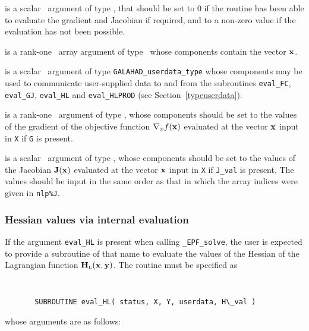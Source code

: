 \documentclass{galahad}
\newcommand{\packagename}{EPF}
\newcommand{\fullpackagename}{\libraryname\_\packagename}
\newcommand{\solver}{{\tt \fullpackagename\_solve}}
\newcommand{\bmHL}{\bmH\sub{L}}
\begin{document}
\begin{description}
 is a scalar \intentout\ argument of type \integer,
that should be set to 0 if the routine has been able to evaluate
the gradient and Jacobian if required,
and to a non-zero value if the evaluation has not been possible.

 is a rank-one \intentin\ array argument of type \realdp\
whose components contain the vector ${\mathbf{x}}$.

 is a scalar \intentinout\ argument of type
{\tt GALAHAD\_userdata\_type} whose components may be used
to communicate user-supplied data to and from the
subroutines {\tt eval\_FC}, {\tt eval\_GJ},
{\tt eval\_HL} and {\tt eval\_HLPROD}
(see Section~\ref{typeuserdata}).

 is a rank-one \intentout\ argument of type \realdp,
whose components should be set to the values of the gradient
of the objective function $\nabla_x f({\mathbf{x}})$
evaluated at the vector ${\mathbf{x}}$ input in {\tt X} if {\tt G} is present.

 is a scalar \intentout\ argument of type \realdp,
whose components should be set to the values of the Jacobian ${\mathbf{J}}({\mathbf{x}})$
evaluated at the vector ${\mathbf{x}}$ input in {\tt X} if {\tt J\_val} is present.
The values should be input in the same order as that in which the array 
indices were given in {\tt nlp\%J}.

\end{description}


\subsubsection{Hessian values via internal evaluation\label{hfv}}

If the argument {\tt eval\_HL} is present when calling \solver, the
user is expected to provide a subroutine of that name to evaluate the
values of the Hessian of the Lagrangian function $\bmHL(\bmx,\bmy)$.
The routine must be specified as

\def\baselinestretch{0.8}
{\tt
\begin{verbatim}
       SUBROUTINE eval_HL( status, X, Y, userdata, H\_val )
\end{verbatim} }
\def\baselinestretch{1.0}
\noindent whose arguments are as follows:
\end{document}
